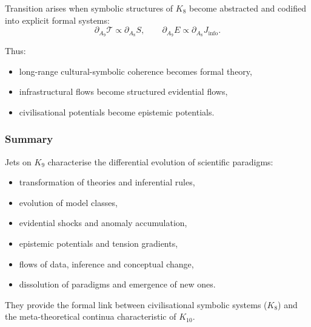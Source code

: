 Transition arises when symbolic structures of $K_8$ become abstracted
and codified into explicit formal systems:
\[
\partial_{A_9}\mathcal{T}
\propto 
\partial_{A_8}S,
\qquad
\partial_{A_9}E
\propto
\partial_{A_8}J_{\mathrm{info}}.
\]

Thus:
\begin{itemize}
    \item long-range cultural-symbolic coherence becomes formal theory,
    \item infrastructural flows become structured evidential flows,
    \item civilisational potentials become epistemic potentials.
\end{itemize}


\subsubsection{Summary}

Jets on $K_9$ characterise the differential evolution of scientific
paradigms:
\begin{itemize}
    \item transformation of theories and inferential rules,
    \item evolution of model classes,
    \item evidential shocks and anomaly accumulation,
    \item epistemic potentials and tension gradients,
    \item flows of data, inference and conceptual change,
    \item dissolution of paradigms and emergence of new ones.
\end{itemize}

They provide the formal link between civilisational symbolic systems
($K_8$) and the meta-theoretical continua characteristic of $K_{10}$.
